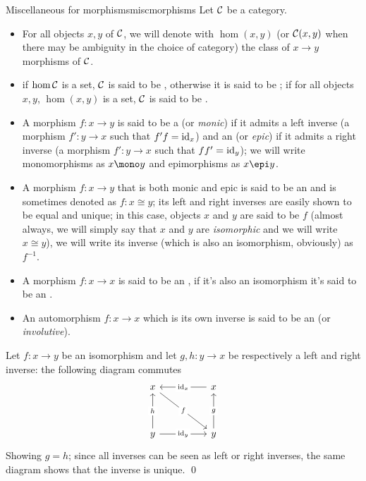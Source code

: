 \documentclass{article}
\begin{document}
\begin{definition}{Miscellaneous for morphisms}{miscmorphisms}
    Let $\mathcal{C}$ be a category.\begin{itemize}
        \item For all objects $x,y$ of $\mathcal{C}$, we will denote with $\hom(x,y)$ (or $\mathcal{C}(x,y)$ when there may be ambiguity in the choice of category) the class of $x\to y$ morphisms of $\mathcal{C}$.
        \item if $\hom\mathcal{C}$ is a set, $\mathcal{C}$ is said to be , otherwise it is said to be ; if for all objects $x,y$, $\hom(x,y)$ is a set, $\mathcal{C}$ is said to be .
        \item A morphism $f: x\to y$ is said to be a  (or \emph{monic}) if it admits a left inverse (a morphism $f': y\to x$ such that $f'f = \operatorname{id}_x$) and an  (or \emph{epic}) if it admits a right inverse (a morphism $f' : y\to x$ such that $ff' = \operatorname{id}_y$); we will write monomorphisms as $x\mono y$ and epimorphisms as $x \epi y$.
        \item A morphism $f: x\to y$ that is both monic and epic is said to be an  and is sometimes denoted as $f: x\cong y$; its left and right inverses are easily shown to be equal and unique; in this case, objects $x$ and $y$ are said to be  $f$ (almost always, we will simply say that $x$ and $y$ are \emph{isomorphic} and we will write $x\cong y$), we will write its inverse (which is also an isomorphism, obviously) as $f^{-1}$.
        \item A morphism $f:x\to x$ is said to be an , if it's also an isomorphism it's said to be an .
        \item An automorphism $f : x\to x$ which is its own inverse is said to be an  (or \emph{involutive}).
    \end{itemize}
    \proof 
    Let $f: x\to y$ be an isomorphism and let $g, h : y\to x$ be respectively a left and right inverse: the following diagram commutes
    \[\begin{tikzcd}
	    x && x \\
	    \\
	    y && y
	    \arrow["f"{description}, from=1-1, to=3-3]
	    \arrow["{\id_x}"{description}, from=1-3, to=1-1]
	    \arrow["h"{description}, from=3-1, to=1-1]
	    \arrow["{\id_y}"{description}, from=3-1, to=3-3]
	    \arrow["g"{description}, from=3-3, to=1-3]
    \end{tikzcd}\]
    Showing $g = h$; since all inverses can be seen as left or right inverses, the same diagram shows that the inverse is unique.
    \qed
\end{definition}
\end{document}
